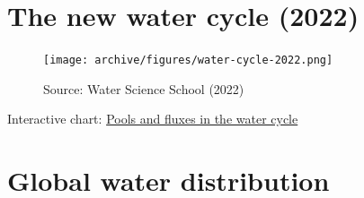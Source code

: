 \documentclass[
  letterpaper,
  DIV=11,
  numbers=noendperiod]{scrreprt}
\begin{document}
\hypertarget{the-new-water-cycle-2022}{%
\section{The new water cycle (2022)}\label{the-new-water-cycle-2022}}

\begin{figure}

{\centering \texttt{[image: archive/figures/water-cycle-2022.png]}

}

\caption{Source: Water Science School (2022)}

\end{figure}

Interactive chart:
\href{https://labs.waterdata.usgs.gov/visualizations/pools-and-fluxes/index.html}{Pools
and fluxes in the water cycle}

\hypertarget{global-water-distribution}{%
\section{Global water distribution}\label{global-water-distribution}}
\end{document}
